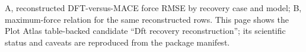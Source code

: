 A, reconstructed DFT-versus-MACE force RMSE by recovery case and model; B, maximum-force relation for the same reconstructed rows. This page shows the Plot Atlas table-backed candidate ``Dft recovery reconstruction''; its scientific status and caveats are reproduced from the package manifest.
